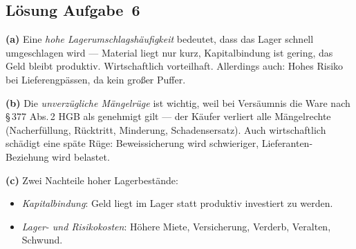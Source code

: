 \documentclass[11pt, a4paper]{article}
\begin{document}
\subsection*{Lösung Aufgabe~6}
\begin{loesung}
\textbf{(a)} Eine \emph{hohe Lagerumschlagshäufigkeit} bedeutet, dass das Lager
schnell umgeschlagen wird --- Material liegt nur kurz, Kapitalbindung ist gering, das
Geld bleibt produktiv. Wirtschaftlich vorteilhaft. Allerdings auch: Hohes Risiko bei
Lieferengpässen, da kein großer Puffer.

\textbf{(b)} Die \emph{unverzügliche Mängelrüge} ist wichtig, weil bei Versäumnis die
Ware nach §\,377 Abs.\,2 HGB als genehmigt gilt --- der Käufer verliert alle
Mängelrechte (Nacherfüllung, Rücktritt, Minderung, Schadensersatz). Auch wirtschaftlich
schädigt eine späte Rüge: Beweissicherung wird schwieriger, Lieferanten-Beziehung
wird belastet.

\textbf{(c)} Zwei Nachteile hoher Lagerbestände:
\begin{itemize}[itemsep=0pt]
  \item \emph{Kapitalbindung}: Geld liegt im Lager statt produktiv investiert zu werden.
  \item \emph{Lager- und Risikokosten}: Höhere Miete, Versicherung, Verderb, Veralten, Schwund.
\end{itemize}
\end{loesung}
\end{document}

